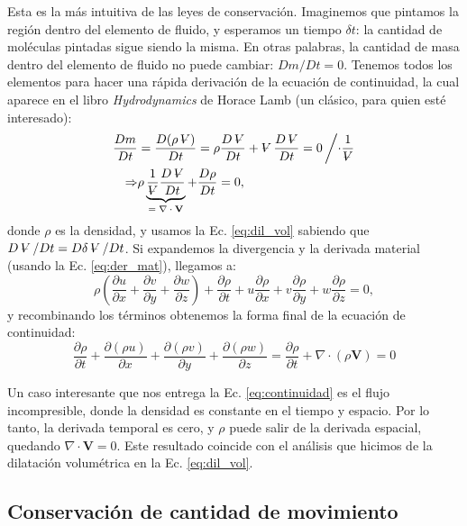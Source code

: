 Esta es la más intuitiva de las leyes de conservación. 
Imaginemos que pintamos la región dentro del elemento de fluido, y esperamos un tiempo $\delta t$: la cantidad de moléculas pintadas sigue siendo la misma.
En otras palabras, la cantidad de masa dentro del elemento de fluido no puede cambiar: $Dm/Dt=0$.
Tenemos todos los elementos para hacer una rápida derivación de la ecuación de continuidad, la cual aparece en el libro \emph{Hydrodynamics} de Horace Lamb (un clásico, para quien esté interesado):
%
\begin{align}
\frac{Dm}{Dt} &= \frac{D(\rho\vol)}{Dt} = \rho\frac{D\vol}{Dt} + \vol\frac{D\vol}{Dt} = 0 \left/\cdot\frac{1}{\vol}\right. \nonumber \\
\Rightarrow & \rho \underbrace{\frac{1}{\vol}\frac{D\vol}{Dt}}_\text{$=\nabla\cdot\mathbf{V}$} + \frac{D\rho}{Dt} = 0,
\end{align}
%
donde $\rho$ es la densidad, y usamos la Ec. \eqref{eq:dil_vol} sabiendo que $D\vol/Dt=D\delta\vol/Dt$. 
Si expandemos la divergencia y la derivada material (usando la Ec. \eqref{eq:der_mat}), llegamos a:
%
\begin{equation}
\rho\left(\frac{\partial u}{\partial x} + \frac{\partial v}{\partial y} + \frac{\partial w}{\partial z}\right) + \frac{\partial \rho}{\partial t} + u\frac{\partial \rho}{\partial x} + v\frac{\partial \rho}{\partial y} +w\frac{\partial \rho}{\partial z} = 0,
\end{equation}
%
y recombinando los términos obtenemos la forma final de la ecuación de continuidad:
%
\begin{equation}\label{eq:continuidad}
\frac{\partial \rho}{\partial t} + \frac{\partial (\rho u)}{\partial x} + \frac{\partial (\rho v)}{\partial y} + \frac{\partial (\rho w)}{\partial z} = \frac{\partial \rho}{\partial t} + \nabla\cdot(\rho\mathbf{V})= 0
\end{equation}

Un caso interesante que nos entrega la Ec. \eqref{eq:continuidad} es el flujo incompresible, donde la densidad es constante en el tiempo y espacio. 
Por lo tanto, la derivada temporal es cero, y $\rho$ puede salir de la derivada espacial, quedando $\nabla\cdot\mathbf{V}=0$.
Este resultado coincide con el análisis que hicimos de la dilatación volumétrica en la Ec. \eqref{eq:dil_vol}.

\subsection*{Conservación de cantidad de movimiento}

